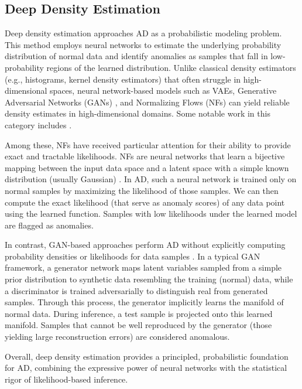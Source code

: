 \documentclass{article}
\begin{document}
\subsection{Deep Density Estimation}
Deep density estimation approaches AD as a probabilistic modeling problem. 
This method employs neural networks to  estimate the underlying probability distribution of normal data and identify anomalies as samples that fall in low-probability regions of the learned distribution.
Unlike classical density estimators (e.g., histograms, kernel density estimators) that often struggle in high-dimensional spaces, neural network-based models such as VAEs, Generative Adversarial Networks (GANs) \citep{goodfellow2014generative}, and Normalizing Flows (NFs) \citep{kobyzev2020normalizing} can yield reliable density estimates in high-dimensional domains.
Some notable work in this category includes \citep{reed2017parallel, zong2018deep, liu2021density, liu2022unsupervised, rosenhahn2024quantum, cook2024feature}.

Among these, NFs have received particular attention for their ability to provide exact and tractable likelihoods. NFs are neural networks that learn a bijective mapping between the input data space and a latent space with a simple known distribution (usually Gaussian) \citep{dinh2017density,kingma2018glow, rosenhahn2024quantum}. In AD, such a neural network is trained only on normal samples by maximizing the likelihood of those samples. We can then compute the exact likelihood (that serve as anomaly scores) of any data point using the learned function. Samples with low likelihoods under the learned model are flagged as anomalies.

In contrast, GAN-based approaches perform AD without explicitly computing probability densities or likelihoods for data samples \citep{liu2021density, liu2022unsupervised, schlegl2019f}.
In a typical GAN framework, a generator network maps latent variables sampled from a simple prior distribution to synthetic data resembling the training (normal) data, while a discriminator is trained adversarially to distinguish real from generated samples. 
Through this process, the generator implicitly learns the manifold of normal data.
During inference, a test sample is projected onto this learned manifold. 
Samples that cannot be well reproduced by the generator (those yielding large reconstruction errors) are considered anomalous.

Overall, deep density estimation provides a principled, probabilistic foundation for AD, combining the expressive power of neural networks with the statistical rigor of likelihood-based inference.
\end{document}
